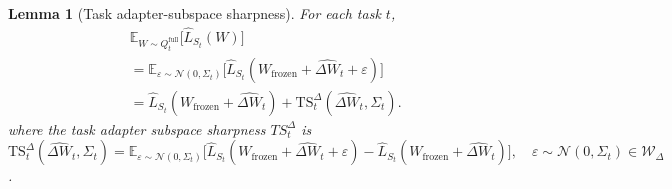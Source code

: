 \documentclass{article}
\theoremstyle{plain}
\newtheorem{lemma}[theorem]{Lemma}
\theoremstyle{definition}
\theoremstyle{remark}
\begin{document}
\begin{lemma}[Task adapter-subspace sharpness]
\label{lem:subspace-loss-pecl}
For each task $t$,
{%
\setlength{\abovedisplayskip}{2pt}
\setlength{\belowdisplayskip}{2pt}
\setlength{\abovedisplayshortskip}{2pt}
\setlength{\belowdisplayshortskip}{2pt}
\begin{equation*}
\label{eq:subspace-loss-pecl}
\begin{aligned}
&\mathbb E_{W\sim Q_t^{\mathrm{full}}}\bigl[\hat L_{S_t}(W)\bigr] \\
&= \mathbb{E}_{\varepsilon\sim\mathcal N(0,\Sigma_t)}
    \big[\hat{L}_{S_t}(W_\mathrm {frozen }+\hat{\Delta W}_t+\varepsilon)\big] \\
& =\hat L_{S_t}(W_{\mathrm{frozen}} + \hat{\Delta W}_t)
+
\mathrm{TS}_t^{\Delta}(\hat{\Delta W}_t,\Sigma_t).
\end{aligned}
\end{equation*}
}where the task adapter subspace sharpness $TS_t^{\Delta}$ is $
\mathrm{TS}_t^{\Delta}(\hat{\Delta W}_t,\Sigma_t)
= \mathbb{E}_{\varepsilon\sim\mathcal N(0,\Sigma_t)}
   \big[\hat{L}_{S_t}(W_\mathrm {frozen }+\hat{\Delta W}_t+\varepsilon)
   - \hat{L}_{S_t}(W_\mathrm {frozen }+\hat{\Delta W}_t)\big],\quad
     \varepsilon\sim\mathcal N(0,\Sigma_t) \in  \mathcal W_\Delta$.
     \end{lemma}

     
\end{document}
